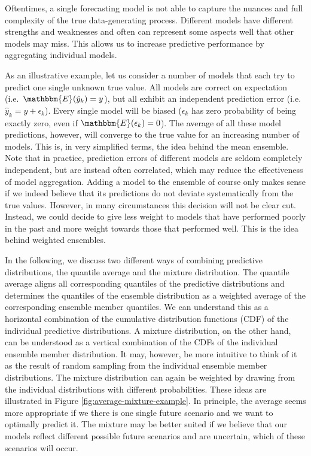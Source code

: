 \documentclass[
]{book}
\renewcommand{\mathbb}{\mathbbm}
\begin{document}
Oftentimes, a single forecasting model is not able to capture the nuances and full complexity of the true data-generating process. Different models have different strengths and weaknesses and often can represent some aspects well that other models may miss. This allows us to increase predictive performance by aggregating individual models.

As an illustrative example, let us consider a number of models that each try to predict one single unknown true value. All models are correct on expectation (i.e.~\(\mathbb{E}(\hat{y}_k) = y\)), but all exhibit an independent prediction error (i.e.~\(\hat{y}_k = y + \epsilon_k\)). Every single model will be biased (\(\epsilon_k\) has zero probability of being exactly zero, even if \(\mathbb{E}(\epsilon_k) = 0\)). The average of all these model predictions, however, will converge to the true value for an increasing number of models. This is, in very simplified terms, the idea behind the mean ensemble. Note that in practice, prediction errors of different models are seldom completely independent, but are instead often correlated, which may reduce the effectiveness of model aggregation. Adding a model to the ensemble of course only makes sense if we indeed believe that its predictions do not deviate systematically from the true values. However, in many circumstances this decision will not be clear cut. Instead, we could decide to give less weight to models that have performed poorly in the past and more weight towards those that performed well. This is the idea behind weighted ensembles.

In the following, we discuss two different ways of combining predictive distributions, the quantile average and the mixture distribution. The quantile average aligns all corresponding quantiles of the predictive distributions and determines the quantiles of the ensemble distribution as a weighted average of the corresponding ensemble member quantiles. We can understand this as a horizontal combination of the cumulative distribution functions (CDF) of the individual predictive distributions. A mixture distribution, on the other hand, can be understood as a vertical combination of the CDFs of the individual ensemble member distribution. It may, however, be more intuitive to think of it as the result of random sampling from the individual ensemble member distributions. The mixture distribution can again be weighted by drawing from the individual distributions with different probabilities. These ideas are illustrated in Figure \ref{fig:average-mixture-example}. In principle, the average seems more appropriate if we there is one single future scenario and we want to optimally predict it. The mixture may be better suited if we believe that our models reflect different possible future scenarios and are uncertain, which of these scenarios will occur.
\end{document}
